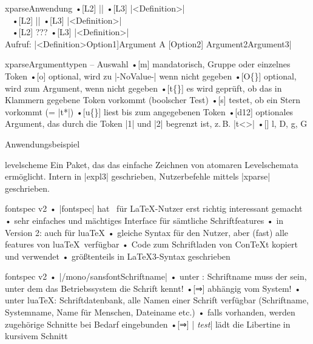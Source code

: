 \documentclass[t]{beamer}
\begin{document}
\begin{frame}[fragile]{xparse}{Anwendung}
•[L2] |\newcommand\mycommand[2]{<Definition>}|
•[L3] |\NewDocumentCommand\mycommand{mm}{<Definition>}|\\%
~\pause
•[L2] |\newcommand\mycommand[opt][2]{<Definition>}|
•[L3] |\NewDocumentCommand\mycommand{O{opt}m}{<Definition>}|\\%
~\pause
•[L2] ???
•[L3] |\NewDocumentCommand\mycommand{sO{opt}mt{A}O{2nd opt}mm}{<...>}|\\%
Aufruf: |\mycommand*[Option1]{Argument} A [Option2] {Argument2}{Argument3}|
\•
\end{frame}

\begin{frame}[fragile]{xparse}{Argumenttypen – Auswahl}
•[m] mandatorisch, Gruppe oder einzelnes Token
•[o] optional, wird zu |-NoValue-| wenn nicht gegeben
•[O\{\}] optional, wird zum Argument, wenn nicht gegeben
•[t\{\}] es wird geprüft, ob das in Klammern gegebene Token vorkommt (boolscher Test)
•[s] testet, ob ein Stern vorkommt (= |t{*}|)
•[u\{\}] liest bis zum angegebenen Token
•[d12] optionales Argument, das durch die Token |1| und |2| begrenzt ist, z.\,B. |t<>|
•[] l, D, g, G
\•
\end{frame}

\begin{frame}{Anwendungsbeispiel}
\begin{block}{levelscheme}
Ein Paket, das das einfache Zeichnen von atomaren Levelschemata ermöglicht. Intern in |expl3| geschrieben, Nutzerbefehle mittels |xparse| geschrieben.
\end{block}
\end{frame}

\begin{frame}[fragile]{fontspec v2}
• |fontspec| hat \XeTeX\ für \LaTeX-Nutzer erst richtig interessant gemacht
• sehr einfaches und mächtiges Interface für sämtliche Schriftfeatures\pause
• in Version 2: auch für lua\TeX
• gleiche Syntax für den Nutzer, aber (fast) alle features von lua\TeX\ verfügbar
• Code zum Schriftladen von Con\TeX t kopiert und verwendet
• größtenteils in \LaTeX3-Syntax geschrieben
\•
\end{frame}

\begin{frame}[fragile]{fontspec v2}
• |\setmain/mono/sansfont{Schriftname}|
• unter \XeTeX: Schriftname muss der sein, unter dem das Betriebssystem die Schrift kennt!
•[⇒] abhängig vom System!
• unter lua\TeX: Schriftdatenbank, alle Namen einer Schrift verfügbar (Schriftname, Systemname, Name für Menschen, Dateiname etc.)
• falls vorhanden, werden zugehörige Schnitte bei Bedarf eingebunden
•[⇒] | \textit{test}| lädt die Libertine in kursivem Schnitt
\•
\end{frame}
\end{document}
